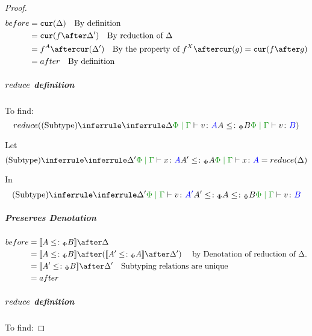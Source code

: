 \documentclass{report}
\begin{document}
\begin{framed}
\begin{proof}
                        \begin{align*}
                            before & = \cur{\D} \qt{By definition}\\
                                    & = \cur{f\after\D'} \qt{By reduction of $\D$} \\
                                    & = f^A\after\cur{\D'}\qt{By the property of $f^X\after\cur{g} = \cur{f\after g}$} \\
                                    & = after \qt{By definition}\\
                        \end{align*}
        
                    \subparagraph{$reduce$ definition}
                    To find:
                    \begin{equation}
                        \reduce(\ntreeruleII{Subtype}{\treeruleI{\D}{\gpetyperelation{v}{A}}}{ A \subtypep B}{\gpetyperelation{v}{B}})
                    \end{equation}
        
                    Let 
                    \begin{equation}\label{SubtypeDeltaReduction}
                        \ntreeruleII{Subtype}{\treeruleI{\D'}{\gpetyperelation{x}{A}}}{ A'\subtypep A}{\gpetyperelation{x}{A}} = \reduce(\D)
                    \end{equation}
        
                    In 
                    \begin{equation}
                        \ntreeruleII{Subtype}{
                            \treeruleI{\D'}{\gpetyperelation{v}{A'}}
                        }{
                        A' \subtypep A \subtypep B
                        }{\gpetyperelation{v}{B}}
                    \end{equation}
        
                    \subparagraph{Preserves Denotation}
                        \begin{align*}
                            before & = \deno{A \subtypep B} \after \D \\
                            & = \deno{A \subtypep B} \after (\deno{A' \subtypep A} \after \D') \qt{ by Denotation of reduction of $\D$.}\\
                            & = \deno{A' \subtypep B} \after \D'\qt{Subtyping relations are unique} \\
                            & = after \\
                        \end{align*}
                    \subparagraph{$reduce$ definition}
                    To find:
                    

\end{proof}
\end{framed}
\end{document}
